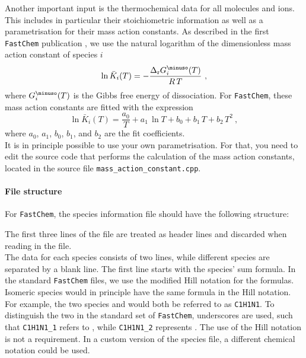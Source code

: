 \documentclass[numbers=noenddot]{aux/fcmanual}
\let\ce\ch
\newcommand{\fc}{\texttt{FastChem}\xspace}
\begin{document}
Another important input is the thermochemical data for all molecules and ions. This includes in particular their stoichiometric information as well as a parametrisation for their mass action constants. As described in the first \fc publication \citep{Stock2018MNRAS.479..865S}, we use the natural logarithm of the dimensionless mass action constant of species $i$
\begin{equation}
\ln\bar{K}_i(T) = - \frac{\Delta_\mathrm{r} G_i^\minuso(T)}{R\,T} \ ,
\label{eq:lnK}
\end{equation}
where $G_i^\minuso(T)$ is the Gibbs free energy of dissociation. 
For \fc, these mass action constants are fitted with the expression
\begin{equation}
\ln\bar{K}_i(T) = \frac{a_0}{T} + a_1\,\ln T + b_0 + b_1\,T + b_2\,T^2 \ ,
\label{eq:fit}
\end{equation}
where $a_0$, $a_1$, $b_0$, $b_1$, and $b_2$ are the fit coefficients.\\
It is in principle possible to use your own parametrisation. For that, you need to edit the source code that performs the calculation of the mass action constants, located in the source file \verb|mass_action_constant.cpp|.

\paragraph{File structure}
For \fc, the species information file should have the following structure:

The first three lines of the file are treated as header lines and discarded when reading in the file. \\

The data for each species consists of two lines, while different species are separated by a blank line.
The first line starts with the species' sum formula. In the standard \fc files, we use the modified Hill notation for the formulas. Isomeric species would in principle have the same formula in the Hill notation. For example, the two species \ce{HCN} and \ce{HNC} would both be referred to as \texttt{C1H1N1}. To distinguish the two in the standard set of \fc, underscores are used, such that \texttt{C1H1N1\_1} refers to \ce{HCN}, while \texttt{C1H1N1\_2} represents \ce{HNC}.
The use of the Hill notation is not a requirement. In a custom version of the species file, a different chemical notation could be used.\\
\end{document}
